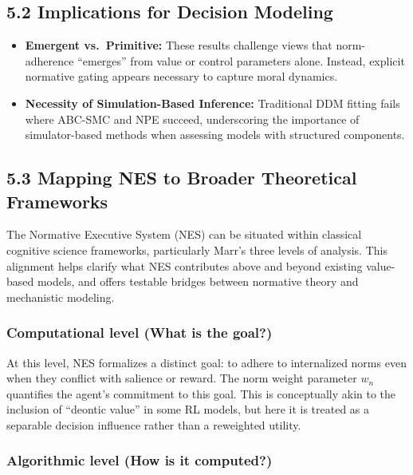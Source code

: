 \documentclass[
  11pt,
]{article}
\providecommand{\tightlist}{%
  \setlength{\itemsep}{0pt}\setlength{\parskip}{0pt}}
\begin{document}
\subsection{5.2 Implications for Decision
Modeling}\label{implications-for-decision-modeling}

\begin{itemize}
\tightlist
\item
  \textbf{Emergent vs.~Primitive:} These results challenge views that
  norm-adherence ``emerges'' from value or control parameters alone.
  Instead, explicit normative gating appears necessary to capture moral
  dynamics.\\
\item
  \textbf{Necessity of Simulation-Based Inference:} Traditional DDM
  fitting fails where ABC-SMC and NPE succeed, underscoring the
  importance of simulator-based methods when assessing models with
  structured components.
\end{itemize}

\subsection{5.3 Mapping NES to Broader Theoretical
Frameworks}\label{mapping-nes-to-broader-theoretical-frameworks}

The Normative Executive System (NES) can be situated within classical
cognitive science frameworks, particularly Marr's three levels of
analysis. This alignment helps clarify what NES contributes above and
beyond existing value-based models, and offers testable bridges between
normative theory and mechanistic modeling.

\subsubsection{Computational level (What is the
goal?)}\label{computational-level-what-is-the-goal}

At this level, NES formalizes a distinct goal: to adhere to internalized
norms even when they conflict with salience or reward. The norm weight
parameter \(w_n\) quantifies the agent's commitment to this goal. This
is conceptually akin to the inclusion of ``deontic value'' in some RL
models, but here it is treated as a separable decision influence rather
than a reweighted utility.

\subsubsection{Algorithmic level (How is it
computed?)}\label{algorithmic-level-how-is-it-computed}
\end{document}

